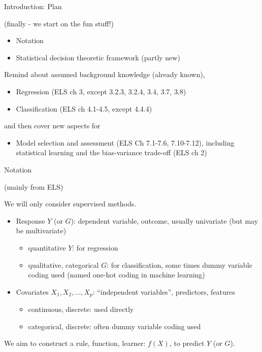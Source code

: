 \documentclass[
  ignorenonframetext,
]{beamer}
\providecommand{\tightlist}{%
  \setlength{\itemsep}{0pt}\setlength{\parskip}{0pt}}
\begin{document}
\begin{frame}{Introduction: Plan}
\protect\hypertarget{introduction-plan}{}

(finally - we start on the fun stuff!)

\begin{itemize}
\tightlist
\item
  Notation
\item
  Statistical decision theoretic framework (partly new)
\end{itemize}

Remind about assumed background knowledge (already known),

\begin{itemize}
\tightlist
\item
  Regression (ELS ch 3, except 3.2.3, 3.2.4, 3.4, 3.7, 3.8)
\item
  Classification (ELS ch 4.1-4.5, except 4.4.4)
\end{itemize}

and then cover new aspects for

\begin{itemize}
\tightlist
\item
  Model selection and assessment (ELS Ch 7.1-7.6, 7.10-7.12), including
  statistical learning and the bias-variance trade-off (ELS ch 2)
\end{itemize}

\end{frame}

\begin{frame}{Notation}
\protect\hypertarget{notation}{}

(mainly from ELS)

We will only consider supervised methods.

\begin{itemize}
\tightlist
\item
  Response \(Y\) (or \(G\)): dependent variable, outcome, usually
  univariate (but may be multivariate)

  \begin{itemize}
  \tightlist
  \item
    quantitative \(Y\): for regression
  \item
    qualitative, categorical \(G\): for classification, some times dummy
    variable coding used (named one-hot coding in machine learning)
  \end{itemize}
\item
  Covariates \(X_1, X_2, \ldots, X_p\): ``independent variables'',
  predictors, features

  \begin{itemize}
  \tightlist
  \item
    continuous, discrete: used directly
  \item
    categorical, discrete: often dummy variable coding used
  \end{itemize}
\end{itemize}

We aim to construct a rule, function, learner: \(f(X)\), to predict
\(Y\) (or \(G\)).

\end{frame}
\end{document}
